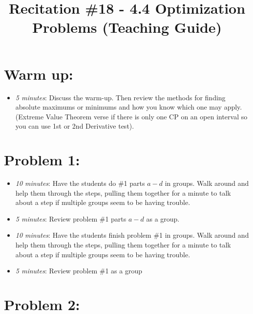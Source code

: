 \documentclass[handout,nooutcomes]{ximera}
\title{Recitation \#18 - 4.4 Optimization Problems (Teaching Guide)}
\begin{document}
\begin{abstract}		\end{abstract}
\maketitle


\section*{Warm up:} 
	
	\begin{itemize}
	
	\item  \emph{5 minutes}:  Discuss the warm-up.  Then review the methods for finding absolute maximums or minimums and how you know which one may apply.  (Extreme Value Theorem verse if there is only one CP on an open interval so you can use 1st or 2nd Derivative test).
	
	
	
	\end{itemize}


\section*{Problem 1:}

	\begin{itemize}
	
	\item  \emph{10 minutes}:  Have the students do \#1 parts $a-d$ in groups.  Walk around and help them through the steps, pulling them together for a minute to talk about a step if multiple groups seem to be having trouble.  
	
	\item  \emph{5 minutes}:  Review problem \#1 parts $a-d$ as a group.
	
	\item  \emph{10 minutes}:  Have the students finish problem \#1 in groups.  Walk around and help them through the steps, pulling them together for a minute to talk about a step if multiple groups seem to be having trouble.  
	
	\item  \emph{5 minutes}:  Review problem \#1 as a group
	
	\end{itemize}



\section*{Problem 2:}
\end{document}
